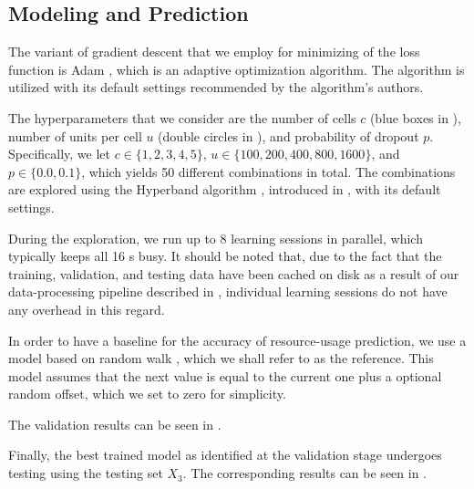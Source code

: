 \subsection{Modeling and Prediction}
The variant of gradient descent that we employ for minimizing of the loss
function is Adam \cite{kingma2014}, which is an adaptive optimization algorithm.
The algorithm is utilized with its default settings recommended by the
algorithm's authors.

The hyperparameters that we consider are the number of cells $c$ (blue boxes in
), number of units per cell $u$ (double circles in ),
and probability of dropout $p$. Specifically, we let $c \in \{1, 2, 3, 4, 5\}$,
$u \in \{100, 200, 400, 800, 1600\}$, and $p \in \{0.0, 0.1\}$, which yields 50
different combinations in total. The combinations are explored using the
Hyperband algorithm \cite{li2016}, introduced in , with its
default settings.

During the exploration, we run up to 8 learning sessions in parallel, which
typically keeps all 16 s busy. It should be noted that, due to the fact
that the training, validation, and testing data have been cached on disk as a
result of our data-processing pipeline described in , individual
learning sessions do not have any overhead in this regard.

In order to have a baseline for the accuracy of resource-usage prediction, we
use a model based on random walk \cite{hastie2009}, which we shall refer to as
the reference. This model assumes that the next value is equal to the current
one plus a optional random offset, which we set to zero for simplicity.


The validation results can be seen in .


Finally, the best trained model as identified at the validation stage undergoes
testing using the testing set $X_3$. The corresponding results can be seen in
.
